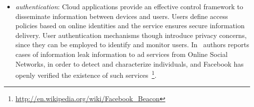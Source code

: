 \begin{itemize}
  \item{\it authentication}: Cloud applications provide an effective control
       framework to disseminate information between devices and users.  Users
       define access policies based on online identities and the service ensures
       secure information delivery.  User authentication mechanisms though
       introduce privacy concerns, since they can be employed to identify and
       monitor users.  In~\cite{Krishnamurthy2009} authors reports cases of
       information leak information to ad services from Online Social Networks,
       in order to detect and characterize individuals, and Facebook has openly
       verified the existence of such
       services~\footnote{\url{http://en.wikipedia.org/wiki/Facebook_Beacon}}. 



\end{itemize}
